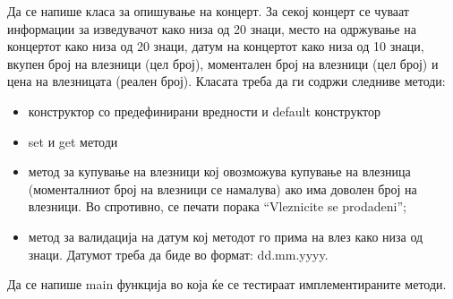 \documentclass[12pt,a4paper]{exam}
\begin{document}
\begin{questions}
\question
Да се напише класа за опишување на концерт. За секој концерт се чуваат
информации за изведувачот како низа од 20 знаци, место на одржување на концертот
како низа од 20 знаци, датум на концертот како низа од 10 знаци, вкупен број на
влезници (цел број), моментален број на влезници (цел број) и цена на влезницата
(реален број). Класата треба да ги содржи следниве методи: 
\begin{itemize}
  \item конструктор со предефинирани вредности и default конструктор
  \item set и get методи
  \item метод за купување на влезници кој овозможува купување на влезница
  (моменталниот број на влезници се намалува) ако има доволен број на влезници.
  Во спротивно, се печати порака ``Vleznicite se prodadeni'';
  \item метод за валидација на датум кој методот го прима на влез како низа
од знаци. Датумот треба да биде во формат: dd.mm.yyyy.
\end{itemize}
Да се напише main функција во која ќе се тестираат имплементираните методи.


\end{questions}
\end{document}
